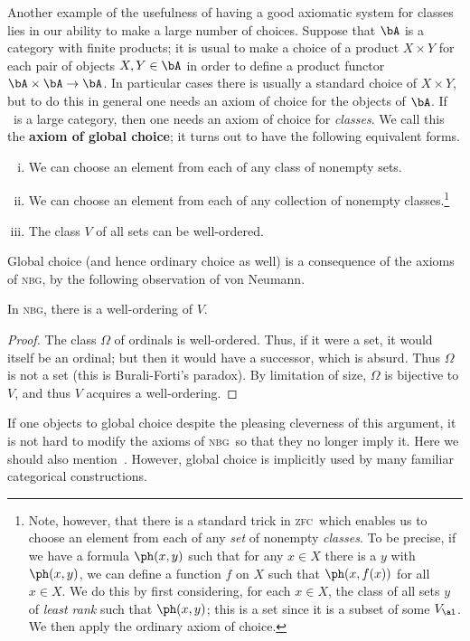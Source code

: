 \documentclass[12pt]{amsart}
\def\zfc{\textsc{zfc}}
\def\nbg{\textsc{nbg}}
\begin{document}
Another example of the usefulness of having a good axiomatic system
for classes lies in our ability to make a large number of choices.
Suppose that $\bA$ is a category with finite products; it is usual to
make a choice of a product $X\times Y$ for each pair of objects
$X,Y\in \bA$ in order to define a product functor
$\bA\times\bA\to\bA$.  In particular cases there is usually a standard
choice of $X\times Y$, but to do this in general one needs an axiom of
choice for the objects of $\bA$.  If \bA\ is a large category, then
one needs an axiom of choice for \emph{classes}.  We call this the
\textbf{axiom of global choice}; it turns out to have the following
equivalent forms.
\begin{enumerate}[(i)]
\item We can choose an element from each of any class of
  nonempty sets.\label{item:gc1}
\item We can choose an element from each of any collection of nonempty
  classes.\label{item:gc2}\footnote{Note, however, that there is a
    standard trick in \zfc\ which enables us to choose an element from
    each of any \emph{set} of nonempty \emph{classes}.  To be precise,
    if we have a formula $\ph(x,y)$ such that for any $x\in X$ there
    is a $y$ with $\ph(x,y)$, we can define a function $f$ on $X$ such
    that $\ph(x,f(x))$ for all $x\in X$.  We do this by first
    considering, for each $x\in X$, the class of all sets $y$ of
    \emph{least rank} such that $\ph(x,y)$; this is a set since it is
    a subset of some $V_\al$.  We then apply the ordinary axiom of
    choice.}
\item The class $V$ of all sets can be well-ordered.\label{item:gc3}
\end{enumerate}
Global choice (and hence ordinary choice as well) is a consequence of
the axioms of \nbg, by the following observation of von Neumann.

\begin{thm}\label{thm:global-choice}
  In \nbg, there is a well-ordering of $V$.
\end{thm}
\begin{proof}
  The class $\Omega$ of ordinals is well-ordered.  Thus, if it
  were a set, it would itself be an ordinal; but then it would have a
  successor, which is absurd.  Thus $\Omega$ is not a set (this
  is Burali-Forti's paradox).  By limitation of size, $\Omega$
  is bijective to $V$, and thus $V$ acquires a well-ordering.
\end{proof}

If one objects to global choice despite the pleasing cleverness of
this argument, it is not hard to modify the axioms of \nbg\ so that they
no longer imply it.  Here we should also
mention~\cite{makkai:avoiding-choice}.  However, global choice is
implicitly used by many familiar categorical constructions.
\end{document}
